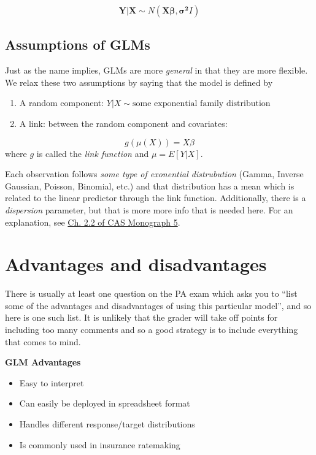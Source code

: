 \documentclass[openany]{book}
\providecommand{\tightlist}{%
  \setlength{\itemsep}{0pt}\setlength{\parskip}{0pt}}
\begin{document}
\[
\mathbf{Y|X} \sim N( \mathbf{X \beta}, \mathbf{\sigma^2} I)
\]

\hypertarget{assumptions-of-glms}{%
\subsection{Assumptions of GLMs}\label{assumptions-of-glms}}

Just as the name implies, GLMs are more \emph{general} in that they are more flexible. We relax these two assumptions by saying that the model is defined by

\begin{enumerate}
\def\labelenumi{\arabic{enumi}.}
\item
  A random component: \(Y|X \sim \text{some exponential family distribution}\)
\item
  A link: between the random component and covariates:
\end{enumerate}

\[g(\mu(X)) = X\beta\]
where \(g\) is called the \emph{link function} and \(\mu = E[Y|X]\).

Each observation follows \emph{some type of exonential distrubution} (Gamma, Inverse Gaussian, Poisson, Binomial, etc.) and that distribution has a mean which is related to the linear predictor through the link function. Additionally, there is a \emph{dispersion} parameter, but that is more more info that is needed here. For an explanation, see \href{https://www.casact.org/pubs/monographs/papers/05-Goldburd-Khare-Tevet.pdf}{Ch. 2.2 of CAS Monograph 5}.

\hypertarget{advantages-and-disadvantages}{%
\section{Advantages and disadvantages}\label{advantages-and-disadvantages}}

There is usually at least one question on the PA exam which asks you to ``list some of the advantages and disadvantages of using this particular model'', and so here is one such list. It is unlikely that the grader will take off points for including too many comments and so a good strategy is to include everything that comes to mind.

\textbf{GLM Advantages}

\begin{itemize}
\tightlist
\item
  Easy to interpret
\item
  Can easily be deployed in spreadsheet format
\item
  Handles different response/target distributions
\item
  Is commonly used in insurance ratemaking
\end{itemize}
\end{document}
